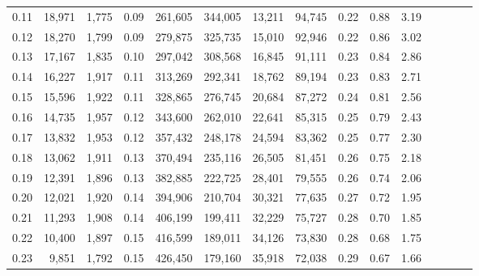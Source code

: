 \begin{tabular}{rrrcrrrrrrrrrrr}
0.11 &  18,971 &  1,775 &                                       0.09 &  261,605 &  344,005 &   13,211 &   94,745 &  0.22 &  0.88 &                         3.19 \\
0.12 &  18,270 &  1,799 &                                       0.09 &  279,875 &  325,735 &   15,010 &   92,946 &  0.22 &  0.86 &                         3.02 \\
0.13 &  17,167 &  1,835 &                                       0.10 &  297,042 &  308,568 &   16,845 &   91,111 &  0.23 &  0.84 &                         2.86 \\
0.14 &  16,227 &  1,917 &                                       0.11 &  313,269 &  292,341 &   18,762 &   89,194 &  0.23 &  0.83 &                         2.71 \\
0.15 &  15,596 &  1,922 &                                       0.11 &  328,865 &  276,745 &   20,684 &   87,272 &  0.24 &  0.81 &                         2.56 \\
0.16 &  14,735 &  1,957 &                                       0.12 &  343,600 &  262,010 &   22,641 &   85,315 &  0.25 &  0.79 &                         2.43 \\
0.17 &  13,832 &  1,953 &                                       0.12 &  357,432 &  248,178 &   24,594 &   83,362 &  0.25 &  0.77 &                         2.30 \\
0.18 &  13,062 &  1,911 &                                       0.13 &  370,494 &  235,116 &   26,505 &   81,451 &  0.26 &  0.75 &                         2.18 \\
0.19 &  12,391 &  1,896 &                                       0.13 &  382,885 &  222,725 &   28,401 &   79,555 &  0.26 &  0.74 &                         2.06 \\
0.20 &  12,021 &  1,920 &                                       0.14 &  394,906 &  210,704 &   30,321 &   77,635 &  0.27 &  0.72 &                         1.95 \\
0.21 &  11,293 &  1,908 &                                       0.14 &  406,199 &  199,411 &   32,229 &   75,727 &  0.28 &  0.70 &                         1.85 \\
0.22 &  10,400 &  1,897 &                                       0.15 &  416,599 &  189,011 &   34,126 &   73,830 &  0.28 &  0.68 &                         1.75 \\
0.23 &   9,851 &  1,792 &                                       0.15 &  426,450 &  179,160 &   35,918 &   72,038 &  0.29 &  0.67 &                         1.66 \\

\end{tabular}
